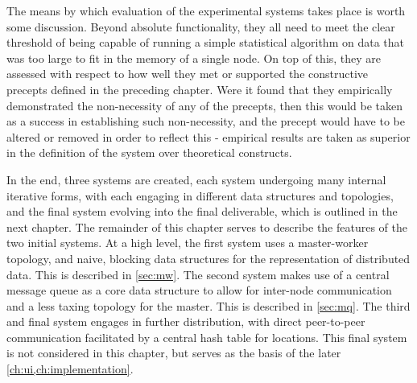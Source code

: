 The means by which evaluation of the experimental systems takes place is worth some discussion.
Beyond absolute functionality, they all need to meet the clear threshold of being capable of running a simple statistical algorithm on data that was too large to fit in the memory of a single node.
On top of this, they are assessed with respect to how well they met or supported the constructive precepts defined in the preceding chapter.
Were it found that they empirically demonstrated the non-necessity of any of the precepts, then this would be taken as a success in establishing such non-necessity, and the precept would have to be altered or removed in order to reflect this - empirical results are taken as superior in the definition of the system over theoretical constructs.

In the end, three systems are created, each system undergoing many internal iterative forms, with each engaging in different data structures and topologies, and the final system evolving into the final deliverable, which is outlined in the next chapter.
The remainder of this chapter serves to describe the features of the two initial systems.
At a high level, the first system uses a master-worker topology, and naive, blocking data structures for the representation of distributed data.
This is described in \cref{sec:mw}.
The second system makes use of a central message queue as a core data structure to allow for inter-node communication and a less taxing topology for the master.
This is described in \cref{sec:mq}.
The third and final system engages in further distribution, with direct peer-to-peer communication facilitated by a central hash table for locations.
This final system is not considered in this chapter, but serves as the basis of the later \cref{ch:ui,ch:implementation}.
